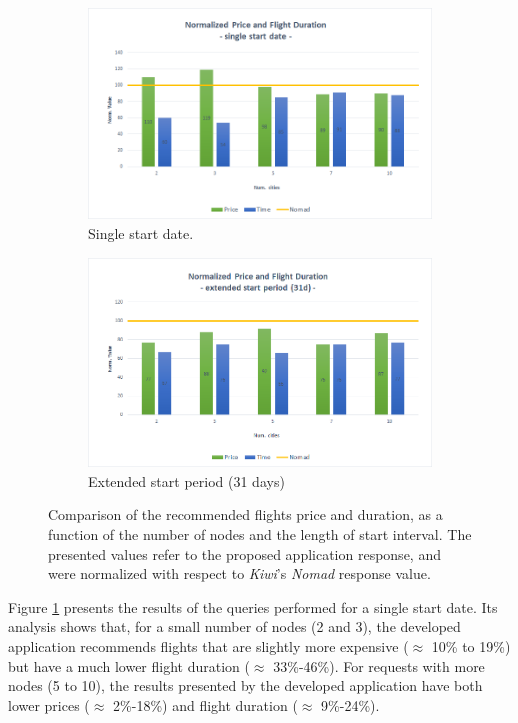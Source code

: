 \begin{figure}[h]
\centering
  \begin{subfigure}{0.49\linewidth} \centering
     \includegraphics[scale=0.4]{./imgs/normalized_results_ss.png}
     \caption{Single start date.}\label{fig:comparison_a}
  \end{subfigure}
  \begin{subfigure}{0.49\linewidth} \centering
     \includegraphics[scale=0.4]{./imgs/normalized_results_es.png}
     \caption{Extended start period (31 days)}\label{fig:comparison_b}
  \end{subfigure}
\caption{Comparison of the recommended flights price and duration, as a function of the number of nodes and the length of start interval. The presented values refer to the proposed application response, and were normalized with respect to \textit{Kiwi}'s \textit{Nomad} response value.}
\label{fig:comparison}
\end{figure}

Figure \ref{fig:comparison_a} presents the results of the queries performed for a single start date. Its analysis shows that, for a small number of nodes (2 and 3), the developed application recommends flights that are slightly more expensive ($\approx$ 10\% to 19\%) but have a much lower flight duration ($\approx$ 33\%-46\%). For requests with more nodes (5 to 10), the results presented by the developed application have both lower prices ($\approx$ 2\%-18\%) and flight duration ($\approx$ 9\%-24\%).

